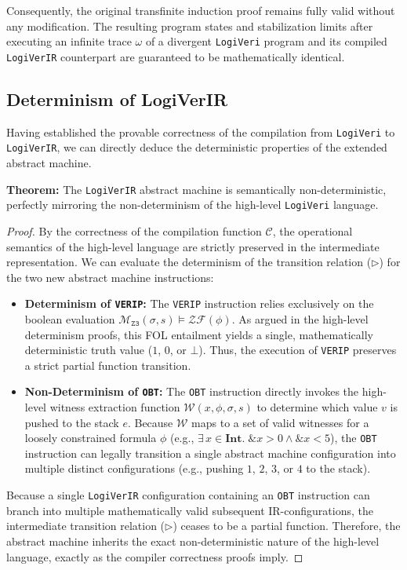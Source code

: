 \documentclass{article}
\begin{document}
Consequently, the original transfinite induction proof remains fully valid without any modification. The resulting program states and stabilization limits after executing an infinite trace $\omega$ of a divergent \texttt{LogiVeri} program and its compiled \texttt{LogiVerIR} counterpart are guaranteed to be mathematically identical.

\subsection{Determinism of LogiVerIR}

Having established the provable correctness of the compilation from \texttt{LogiVeri} to \texttt{LogiVerIR}, we can directly deduce the deterministic properties of the extended abstract machine.

\textbf{Theorem:} The \texttt{LogiVerIR} abstract machine is semantically non-deterministic, perfectly mirroring the non-determinism of the high-level \texttt{LogiVeri} language.

\begin{proof}
By the correctness of the compilation function $\mathcal{C}$, the operational semantics of the high-level language are strictly preserved in the intermediate representation. We can evaluate the determinism of the transition relation ($\triangleright$) for the two new abstract machine instructions:

\begin{itemize}
    \item \textbf{Determinism of \texttt{VERIP}:} The \texttt{VERIP} instruction relies exclusively on the boolean evaluation $\mathcal{M}_{\mathtt{Z3}}(\sigma, s) \models \mathcal{ZF}(\phi)$. As argued in the high-level determinism proofs, this FOL entailment yields a single, mathematically deterministic truth value ($1$, $0$, or $\bot$). Thus, the execution of \texttt{VERIP} preserves a strict partial function transition.
    
    \item \textbf{Non-Determinism of \texttt{OBT}:} The \texttt{OBT} instruction directly invokes the high-level witness extraction function $\mathcal{W}(x, \phi, \sigma, s)$ to determine which value $v$ is pushed to the stack $e$. Because $\mathcal{W}$ maps to a set of valid witnesses for a loosely constrained formula $\phi$ (e.g., $\exists\, x \in \textbf{Int}.\; \texttt{\&}x > 0 \land \texttt{\&}x < 5$), the \texttt{OBT} instruction can legally transition a single abstract machine configuration into multiple distinct configurations (e.g., pushing $1$, $2$, $3$, or $4$ to the stack).
\end{itemize}

Because a single \texttt{LogiVerIR} configuration containing an \texttt{OBT} instruction can branch into multiple mathematically valid subsequent IR-configurations, the intermediate transition relation ($\triangleright$) ceases to be a partial function. Therefore, the abstract machine inherits the exact non-deterministic nature of the high-level language, exactly as the compiler correctness proofs imply.
\end{proof}
\end{document}
